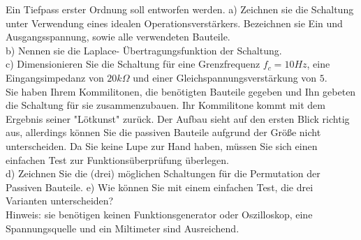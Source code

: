 \documentclass[A4]{scrreprt}
\begin{document}
  Ein Tiefpass erster Ordnung soll entworfen werden.
  a) Zeichnen sie die Schaltung unter Verwendung eines idealen Operationsverstärkers.
  Bezeichnen sie Ein und Ausgangsspannung, sowie alle verwendeten Bauteile.\\
  b) Nennen sie die Laplace- Übertragungsfunktion der Schaltung.\\
  c) Dimensionieren Sie die Schaltung für eine Grenzfrequenz $f_c = 10Hz$, eine Eingangsimpedanz von $20k\Omega$ und einer Gleichspannungsverstärkung von $5$.\\
  Sie haben Ihrem Kommilitonen, die benötigten Bauteile gegeben und Ihn gebeten die Schaltung für sie zusammenzubauen. 
  Ihr Kommilitone kommt mit dem Ergebnis seiner "Lötkunst" zurück.
  Der Aufbau sieht auf den ersten Blick richtig aus, allerdings können Sie die passiven Bauteile aufgrund der Größe nicht unterscheiden. 
  Da Sie keine Lupe zur Hand haben, müssen Sie sich einen einfachen Test zur Funktionsüberprüfung überlegen.\\
  d) Zeichnen Sie die (drei) möglichen Schaltungen für die Permutation der Passiven Bauteile.
  e) Wie können Sie mit einem einfachen Test, die drei Varianten unterscheiden?\\
  Hinweis: sie benötigen keinen Funktionsgenerator oder Oszilloskop, eine Spannungsquelle und ein Miltimeter sind Ausreichend.\\
\end{document}
